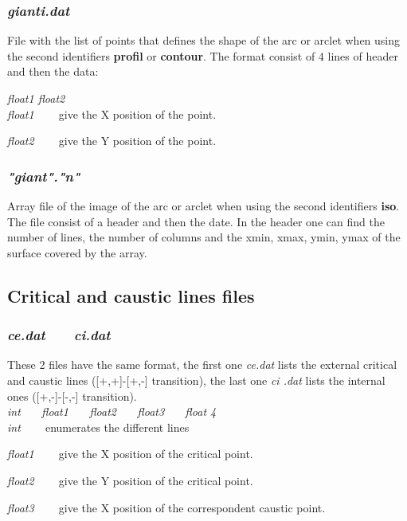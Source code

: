 \subsubsection{\sl gianti.dat }

File with the list of points that defines the shape of the arc or arclet
when using the  second identifiers {\bf profil} or {\bf contour}.
The format consist of 4 lines of header and then the data:

{\sl float1 float2}\\

{\sl float1 \ \ \ } give the X position of the point.

{\sl float2 \ \ \ } give the Y position of the point.

\subsubsection{\sl "giant"."n"}

Array file of the image of the arc or arclet when using the
second identifiers {\bf iso}. The file consist of a header and then the date.
In the header one can find the number of lines, the number of columns and
the xmin, xmax, ymin, ymax of the surface covered by the array.


\subsection{Critical and caustic lines files}

\subsubsection{\sl ce.dat \ \ \ ci.dat}

These 2 files have the same format, the first one {\sl ce.dat} lists
the external critical and caustic lines ([+,+]-[+,-] transition),
the last one {\sl ci .dat} lists the internal ones ([+,-]-[-,-] transition).\\


{\sl int \ \ \ float1 \ \ \ float2 \ \ \ float3 \ \ \ float 4}\\

{\sl int \ \ \ } enumerates the different lines

{\sl float1 \ \ \ } give the X position of the critical point.

{\sl float2 \ \ \ } give the Y position of the critical point.

{\sl float3 \ \ \ } give the X position of the correspondent caustic point.

